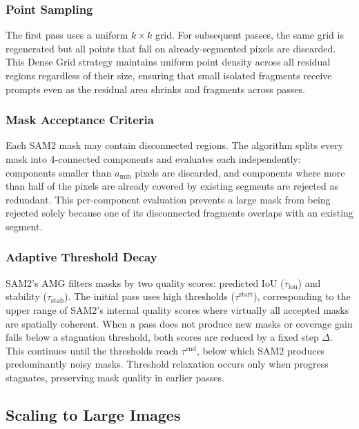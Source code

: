 \documentclass[review,11pt,authoryear]{elsarticle}
\begin{document}
\subsubsection{Point Sampling}
\label{sec:method_points}

The first pass uses a uniform $k \times k$ grid. For subsequent passes, the same grid is regenerated but all points that fall on already-segmented pixels are discarded. This Dense Grid strategy maintains uniform point density across all residual regions regardless of their size, ensuring that small isolated fragments receive prompts even as the residual area shrinks and fragments across passes.

\subsubsection{Mask Acceptance Criteria}
\label{sec:method_acceptance}

Each SAM2 mask may contain disconnected regions. The algorithm splits every mask into 4-connected components and evaluates each independently: components smaller than $a_{\min}$ pixels are discarded, and components where more than half of the pixels are already covered by existing segments are rejected as redundant. This per-component evaluation prevents a large mask from being rejected solely because one of its disconnected fragments overlaps with an existing segment.

\subsubsection{Adaptive Threshold Decay}
\label{sec:method_threshold}

SAM2's AMG filters masks by two quality scores: predicted IoU ($\tau_{\text{iou}}$) and stability ($\tau_{\text{stab}}$). The initial pass uses high thresholds ($\tau^{\text{start}}$), corresponding to the upper range of SAM2's internal quality scores where virtually all accepted masks are spatially coherent. When a pass does not produce new masks or coverage gain falls below a stagnation threshold, both scores are reduced by a fixed step $\Delta$. This continues until the thresholds reach $\tau^{\text{end}}$, below which SAM2 produces predominantly noisy masks. Threshold relaxation occurs only when progress stagnates, preserving mask quality in earlier passes.

\subsection{Scaling to Large Images}
\label{sec:method_scaling}
\end{document}
